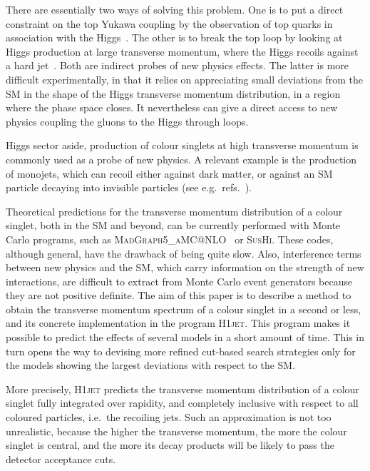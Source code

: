 \documentclass[12pt]{article}
\begin{document}
There are essentially two ways of solving this problem. One is to put
a direct constraint on the top Yukawa coupling by the
observation of top quarks in association with the
Higgs~\cite{Aad:2020ivc,Sirunyan:2020sum,Maltoni:2016yxb}. The other is
to break the top loop by looking at Higgs production at large
transverse momentum, where the Higgs recoils against a hard
jet~\cite{Azatov:2013xha,Grojean:2013nya,Banfi:2013yoa}. Both are
indirect probes of new physics effects. The latter is more difficult
experimentally, in that it relies on appreciating small deviations from
the SM in the shape of the Higgs transverse momentum distribution, in
a region where the phase space closes. It nevertheless can give a
direct access to new physics coupling the gluons to the Higgs through loops.

Higgs sector aside, production of colour singlets at high transverse
momentum is commonly used as a probe of new physics. A relevant
example is the production of monojets, which can recoil
either against dark matter, or against an SM particle decaying into
invisible particles (see e.g.\ refs.~\cite{Sirunyan:2017hci,Aaboud:2019yqu}).

Theoretical predictions for the transverse momentum distribution of a
colour singlet, both in the SM and beyond, can be currently performed
with Monte Carlo programs, such as
\textsc{MadGraph5\_aMC@NLO}~\cite{Alwall:2014hca} or
\textsc{SusHi}\cite{Harlander:2012pb,Harlander:2016hcx}. These codes,
although general, have the drawback of being quite slow. Also,
interference terms between new physics and the SM, which
carry information on the strength of new interactions, are difficult
to extract from Monte Carlo event generators because they are not positive
definite. The aim of this paper is to describe a method to obtain the
transverse momentum spectrum of a colour singlet in a second or less,
and its concrete implementation in the program \textsc{H1jet}. This program
makes it possible to predict the effects of several models in a short
amount of time. This in turn opens the way to devising more refined
cut-based search strategies only for the models showing the largest
deviations with respect to the SM.

More precisely, \textsc{H1jet} predicts the transverse momentum distribution of
a colour singlet fully integrated over rapidity, and completely
inclusive with respect to all coloured particles, i.e.\ the recoiling
jets. Such an approximation is not too unrealistic, because the higher the
transverse momentum, the more the colour singlet is central, and the
more its decay products will be likely to pass the detector acceptance
cuts.
\end{document}
